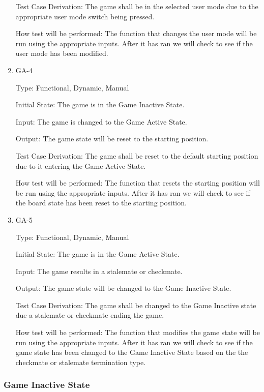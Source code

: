 \documentclass[12pt, titlepage]{article}
\begin{document}
\begin{enumerate}
  Test Case Derivation: The game shall be in the selected user mode due to the appropriate user mode switch being pressed.
  
  How test will be performed: The function that changes the user mode will be run using the appropriate inputs.
  After it has ran we will check to see if the user mode has been modified.
  
  \item{GA-4\\}
  
  Type: Functional, Dynamic, Manual
                      
  Initial State: The game is in the Game Inactive State.
                      
  Input: The game is changed to the Game Active State.
  
  Output: The game state will be reset to the starting position.
                      
  Test Case Derivation: The game shall be reset to the default starting position due to it entering the Game Active State.
  
  How test will be performed: The function that resets the starting position will be run using the appropriate inputs.
  After it has ran we will check to see if the board state has been reset to the starting position.
  
  \item{GA-5\\}
  
  Type: Functional, Dynamic, Manual
                      
  Initial State: The game is in the Game Active State.
                      
  Input: The game results in a stalemate or checkmate.
  
  Output: The game state will be changed to the Game Inactive State.
                      
  Test Case Derivation: The game shall be changed to the Game Inactive state due a stalemate or checkmate ending the game.
  
  How test will be performed: The function that modifies the game state will be run using the appropriate inputs.
  After it has ran we will check to see if the game state has been changed to the Game Inactive State based on the
  the checkmate or stalemate termination type.
  
  \end{enumerate}
  
  \subsubsection{Game Inactive State}
  
\end{document}
